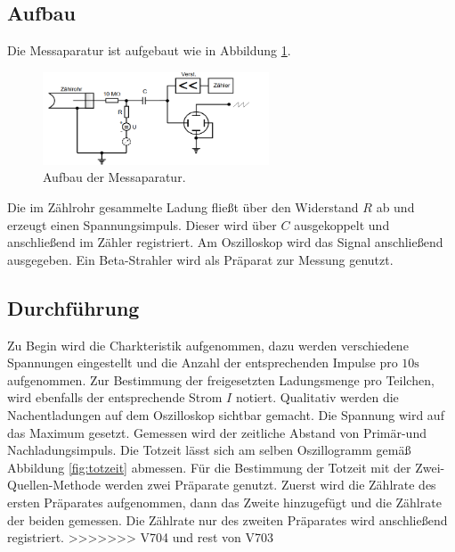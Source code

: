 \subsection{Aufbau}
Die Messaparatur ist aufgebaut wie in Abbildung \ref{fig:aufbau}.
\begin{figure}
  \centering
  \includegraphics[width=0.6\textwidth]{aufbau.PNG}
  \caption{Aufbau der Messaparatur.\cite{sample}}
  \label{fig:aufbau}
\end{figure}
Die im Zählrohr gesammelte Ladung fließt über den Widerstand $R$ ab und erzeugt einen Spannungsimpuls. Dieser wird über $C$ ausgekoppelt und
anschließend im Zähler registriert. Am Oszilloskop wird das Signal anschließend ausgegeben. Ein Beta-Strahler wird als Präparat
zur Messung genutzt.
\subsection{Durchführung}
Zu Begin wird die Charkteristik aufgenommen, dazu werden verschiedene Spannungen eingestellt und die Anzahl der entsprechenden
Impulse pro $10\si{\second}$ aufgenommen. Zur Bestimmung der freigesetzten Ladungsmenge pro Teilchen, wird ebenfalls der entsprechende
Strom $I$ notiert.
Qualitativ werden die Nachentladungen auf dem Oszilloskop sichtbar gemacht. Die Spannung wird auf das Maximum gesetzt. Gemessen
wird der zeitliche Abstand von Primär-und Nachladungsimpuls. Die Totzeit lässt sich am selben
Oszillogramm gemäß Abbildung \ref{fig:totzeit} abmessen.
Für die Bestimmung der Totzeit mit der Zwei-Quellen-Methode werden zwei Präparate genutzt. Zuerst wird die Zählrate
des ersten Präparates aufgenommen, dann das Zweite hinzugefügt und die Zählrate der beiden gemessen. Die Zählrate nur des zweiten Präparates
wird anschließend registriert.
>>>>>>> V704 und rest von V703
